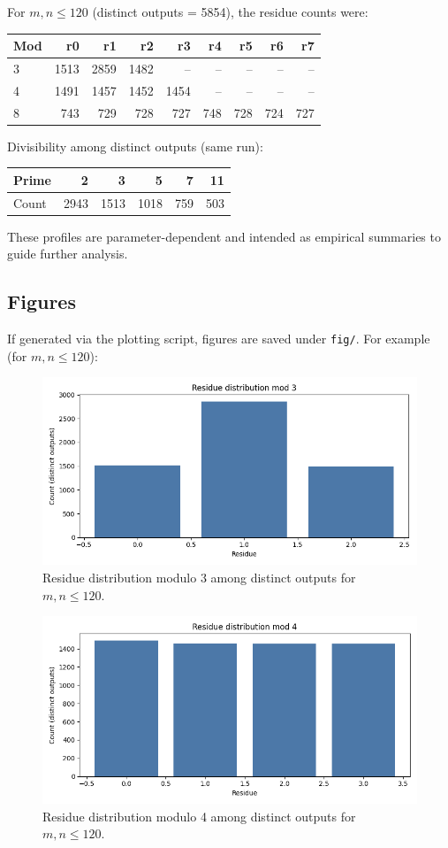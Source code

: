 \documentclass[12pt,a4paper]{article}
\begin{document}
For \(m,n\le 120\) (distinct outputs = 5854), the residue counts were:
\begin{center}
\begin{tabular}{l|rrrrrrrr}
Mod & r0 & r1 & r2 & r3 & r4 & r5 & r6 & r7 \\
\hline
3 & 1513 & 2859 & 1482 & -- & -- & -- & -- & -- \\
4 & 1491 & 1457 & 1452 & 1454 & -- & -- & -- & -- \\
8 & 743 & 729 & 728 & 727 & 748 & 728 & 724 & 727 \\
\end{tabular}
\end{center}

Divisibility among distinct outputs (same run):
\begin{center}
\begin{tabular}{l|rrrrr}
Prime & 2 & 3 & 5 & 7 & 11 \\
\hline
Count & 2943 & 1513 & 1018 & 759 & 503 \\
\end{tabular}
\end{center}

These profiles are parameter-dependent and intended as empirical summaries to guide further analysis.

\subsection*{Figures}
If generated via the plotting script, figures are saved under \texttt{fig/}. For example (for \(m,n\le 120\)):
\begin{figure}[h]
\centering
\includegraphics[width=0.7\linewidth]{../fig/residues_mod_3.png}
\caption{Residue distribution modulo 3 among distinct outputs for \(m,n\le 120\).}
\label{fig:mod3}
\end{figure}

\begin{figure}[h]
\centering
\includegraphics[width=0.7\linewidth]{../fig/residues_mod_4.png}
\caption{Residue distribution modulo 4 among distinct outputs for \(m,n\le 120\).}
\label{fig:mod4}
\end{figure}
\end{document}
